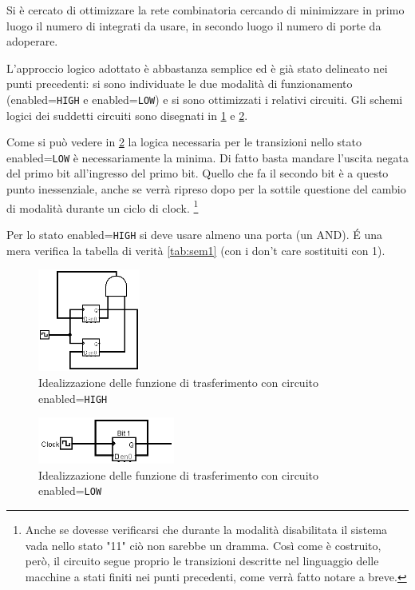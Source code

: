 \documentclass[a4paper,10pt]{article}
\def\code#1{\texttt{#1}}
\begin{document}
Si è cercato di ottimizzare la rete combinatoria cercando di minimizzare in primo luogo il numero di integrati da usare, in secondo luogo il numero di porte da adoperare.

L'approccio logico adottato è abbastanza semplice ed è già stato delineato nei punti precedenti: si sono individuate le due modalità di funzionamento (enabled=\code{HIGH} e enabled=\code{LOW}) e si sono ottimizzati i relativi circuiti. 
Gli schemi logici dei suddetti circuiti sono disegnati in \cref{fig:enabled} e \cref{fig:disabled}.
\newline


Come si può vedere in \cref{fig:disabled} la logica necessaria per le transizioni nello stato enabled=\code{LOW} è necessariamente la minima. Di fatto basta mandare l'uscita negata del primo bit all'ingresso del primo bit. Quello che fa il secondo bit è a questo punto inessenziale, anche se verrà ripreso dopo per la sottile questione del cambio di modalità durante un ciclo di clock. \footnote{Anche se dovesse verificarsi che durante la modalità disabilitata il sistema vada nello stato "11" ciò non sarebbe un dramma. Così come è costruito, però, il circuito segue proprio le transizioni descritte nel linguaggio delle macchine a stati finiti nei punti precedenti, come verrà fatto notare a breve.}


Per lo stato enabled=\code{HIGH} si deve usare almeno una porta (un AND). 
\'E una mera verifica la tabella di verità \cref{tab:sem1} (con i don't care sostituiti con 1).
\newline



\begin{figure}[H]
	\centering
	\includegraphics[width=0.3\textwidth]{../grafici/enabled.png}
	\caption{Idealizzazione delle funzione di trasferimento con circuito enabled=\code{HIGH}}
	\label{fig:enabled}
\end{figure}


\begin{figure}[H]
	\centering
	\includegraphics[width=0.4\textwidth]{../grafici/disabled1.png}
	\caption{Idealizzazione delle funzione di trasferimento con circuito enabled=\code{LOW}}
	\label{fig:disabled}
\end{figure}
\end{document}
